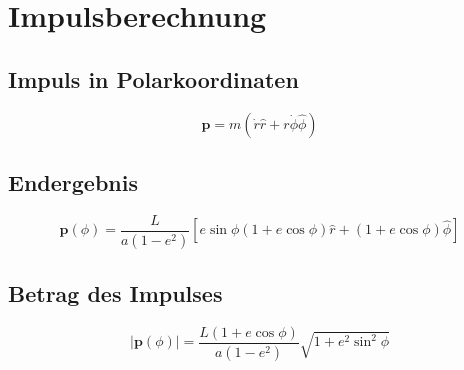 \section{Impulsberechnung}
\subsection{Impuls in Polarkoordinaten}
\[
\mathbf{p} = m \left( \dot{r} \hat{r} + r\dot{\phi} \hat{\phi} \right)
\]

\subsection{Endergebnis}
\[
\boxed{ \mathbf{p}(\phi) = \frac{L}{a(1 - e^2)} \left[ e \sin \phi (1 + e \cos \phi) \hat{r} + (1 + e \cos \phi) \hat{\phi} \right] }
\]

\subsection{Betrag des Impulses}
\[
|\mathbf{p}(\phi)| = \frac{L(1 + e \cos \phi)}{a(1 - e^2)} \sqrt{1 + e^2 \sin^2 \phi}
\]